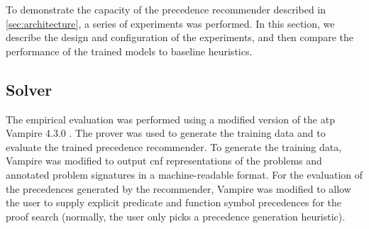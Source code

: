 
To demonstrate the capacity of the precedence recommender described in \cref{sec:architecture},
a series of experiments was performed.
In this section, we describe the design and configuration of the experiments,
and then compare the performance of the trained models to baseline heuristics.

\subsection{Solver}

The empirical evaluation was performed using a modified version of the \gls{atp} Vampire 4.3.0 \cite{10.1007/978-3-642-39799-8_1}.
The prover was used to generate the training data and to evaluate the trained precedence recommender.
To generate the training data,
Vampire was modified to output \gls{cnf} representations of the problems
and annotated problem signatures in a machine-readable format.
For the evaluation of the precedences generated by the recommender,
Vampire was modified to allow the user to supply explicit predicate and function symbol precedences for the proof search
(normally, the user only picks a precedence generation heuristic).





